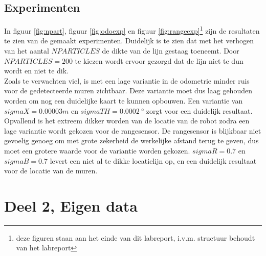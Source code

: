 \documentclass[a4paper]{article}
\begin{document}
\subsection{Experimenten}
In figuur \ref{fig:npart}, figuur \ref{fig:odoexp} en figuur \ref{fig:rangeexp}\footnote{deze figuren staan aan het einde van dit labreport, i.v.m. structuur behoudt van het labreport} zijn de resultaten te zien van de gemaakt experimenten. Duidelijk is te zien dat met het verhogen van het aantal $NPARTICLES$ de dikte van de lijn gestaag toeneemt. Door $NPARTICLES =200$ te kiezen wordt ervoor gezorgd dat de lijn niet te dun wordt en niet te dik.\\
Zoals te verwachten viel, is met een lage variantie in de odometrie minder ruis voor de gedetecteerde muren zichtbaar. Deze variantie moet dus laag gehouden worden om nog een duidelijke kaart te kunnen opbouwen. Een variantie van $sigmaX=0.00003m$ en $sigmaTH=\SI{0.0002}{\degree}$ zorgt voor een duidelijk resultaat.\\
Opvallend is het extreem dikker worden van de locatie van de robot zodra een lage variantie wordt gekozen voor de rangesensor. De rangesensor is blijkbaar niet gevoelig genoeg om met grote zekerheid de werkelijke afstand terug te geven, dus moet een grotere waarde voor de variantie worden gekozen. $sigmaR=0.7$ en $sigmaB=0.7$ levert een niet al te dikke locatielijn op, en een duidelijk resultaat voor de locatie van de muren.

\section{Deel 2, Eigen data}
\end{document}
